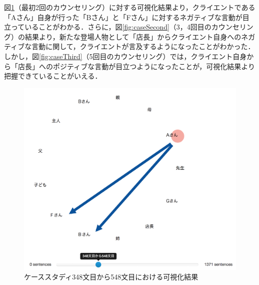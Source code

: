 \documentclass[shuuron]{kuee}
\begin{document}
図\ref{fig:caseFirst}（最初2回のカウンセリング）に対する可視化結果より，クライエントである「Aさん」自身が行った「Bさん」と「Fさん」に対するネガティブな言動が目立っていることがわかる．さらに，図\ref{fig:caseSecond}（3，4回目のカウンセリング）の結果より，新たな登場人物として「店長」からクライエント自身へのネガティブな言動に関して，クライエントが言及するようになったことがわかった．しかし，図\ref{fig:caseThird}（5回目のカウンセリング）では，クライエント自身から「店長」へのポジティブな言動が目立つようになったことが，可視化結果より把握できていることがいえる．


\begin{figure}
  \begin{center}
    \includegraphics[width=\linewidth]{caseFirst.png}
  \end{center}
  \caption{ケーススタディ348文目から548文目における可視化結果}
  \label{fig:caseFirst}
\end{figure}
\end{document}
